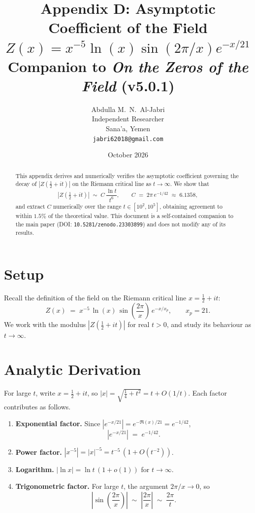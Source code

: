 \documentclass[11pt,a4paper]{article}
\title{\textbf{Appendix D: Asymptotic Coefficient of the Field}\\[0.3em]
$Z(x)=x^{-5}\ln(x)\sin(2\pi/x)e^{-x/21}$\\[0.4em]
\large Companion to \textit{On the Zeros of the Field} (v5.0.1)}
\author{Abdulla M.~N.~Al-Jabri\\
\small Independent Researcher\\
\small Sana'a, Yemen\\
\small \texttt{jabri62018@gmail.com}}
\date{October 2026}
\begin{document}
\maketitle
\thispagestyle{fancy}

\begin{abstract}
This appendix derives and numerically verifies the asymptotic
coefficient governing the decay of $|Z(\tfrac12+it)|$ on the Riemann
critical line as $t\to\infty$. We show that
\[
|Z(\tfrac12+it)| \;\sim\; C\,\frac{\ln t}{t^{6}},
\qquad
C \;=\; 2\pi\,e^{-1/42} \;\approx\; 6.1358,
\]
and extract $C$ numerically over the range $t\in[10^{2},10^{5}]$,
obtaining agreement to within $1.5\%$ of the theoretical value.
This document is a self-contained companion to the main paper
(DOI: \texttt{10.5281/zenodo.23303899}) and does not modify any of
its results.
\end{abstract}

\section{Setup}

Recall the definition of the field on the Riemann critical line
$x = \tfrac12 + it$:
\begin{equation}
Z(x) \;=\; x^{-5}\,\ln(x)\,\sin\!\left(\frac{2\pi}{x}\right)\,e^{-x/x_p},
\qquad x_p = 21.
\label{eq:Z}
\end{equation}
We work with the modulus $|Z(\tfrac12+it)|$ for real $t > 0$,
and study its behaviour as $t\to\infty$.

\section{Analytic Derivation}

For large $t$, write $x = \tfrac12 + it$, so
$|x| = \sqrt{\tfrac14+t^{2}} = t + O(1/t)$.
Each factor contributes as follows.

\begin{enumerate}
\item \textbf{Exponential factor.}
Since $|e^{-x/21}| = e^{-\Re(x)/21} = e^{-1/42}$,
\[
|e^{-x/21}| \;=\; e^{-1/42}.
\]

\item \textbf{Power factor.}
$|x^{-5}| = |x|^{-5} = t^{-5}\,(1+O(t^{-2}))$.

\item \textbf{Logarithm.}
$|\ln x| = \ln t\,(1+o(1))$ for $t\to\infty$.

\item \textbf{Trigonometric factor.}
For large $t$, the argument $2\pi/x\to 0$, so
\[
\left|\sin\!\left(\frac{2\pi}{x}\right)\right|
\;\sim\; \left|\frac{2\pi}{x}\right| \;\sim\; \frac{2\pi}{t}.
\]
\end{enumerate}
\end{document}
